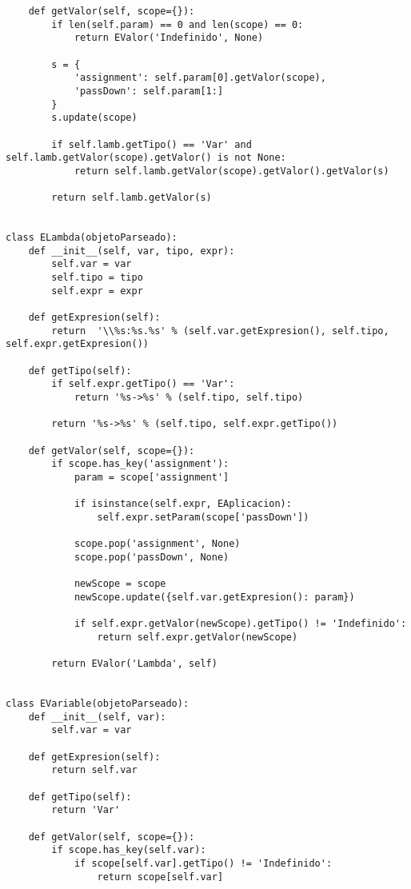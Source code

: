 \begin{verbatim}
    def getValor(self, scope={}):
        if len(self.param) == 0 and len(scope) == 0:
            return EValor('Indefinido', None)

        s = {
            'assignment': self.param[0].getValor(scope),
            'passDown': self.param[1:]
        }
        s.update(scope)

        if self.lamb.getTipo() == 'Var' and self.lamb.getValor(scope).getValor() is not None:
            return self.lamb.getValor(scope).getValor().getValor(s)

        return self.lamb.getValor(s)


class ELambda(objetoParseado):    
    def __init__(self, var, tipo, expr):
        self.var = var
        self.tipo = tipo
        self.expr = expr

    def getExpresion(self):
        return  '\\%s:%s.%s' % (self.var.getExpresion(), self.tipo, self.expr.getExpresion())
    
    def getTipo(self):
        if self.expr.getTipo() == 'Var':
            return '%s->%s' % (self.tipo, self.tipo)

        return '%s->%s' % (self.tipo, self.expr.getTipo())
    
    def getValor(self, scope={}):
        if scope.has_key('assignment'):
            param = scope['assignment']

            if isinstance(self.expr, EAplicacion):
                self.expr.setParam(scope['passDown'])
           
            scope.pop('assignment', None)
            scope.pop('passDown', None)

            newScope = scope
            newScope.update({self.var.getExpresion(): param})

            if self.expr.getValor(newScope).getTipo() != 'Indefinido':
                return self.expr.getValor(newScope)
        
        return EValor('Lambda', self)


class EVariable(objetoParseado):
    def __init__(self, var):
        self.var = var

    def getExpresion(self):        
        return self.var
    
    def getTipo(self):
        return 'Var'

    def getValor(self, scope={}):
        if scope.has_key(self.var):
            if scope[self.var].getTipo() != 'Indefinido':
                return scope[self.var]
        

\end{verbatim}

